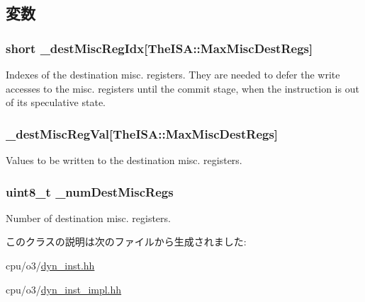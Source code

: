\subsection{変数}
\hypertarget{classBaseO3DynInst_acb44bcca662946d56b308535bf3a53e8}{
\subsubsection[{\_\-destMiscRegIdx}]{\setlength{\rightskip}{0pt plus 5cm}short {\bf \_\-destMiscRegIdx}\mbox{[}TheISA::MaxMiscDestRegs\mbox{]}}}
\label{classBaseO3DynInst_acb44bcca662946d56b308535bf3a53e8}
Indexes of the destination misc. registers. They are needed to defer the write accesses to the misc. registers until the commit stage, when the instruction is out of its speculative state. \hypertarget{classBaseO3DynInst_a337a2257f9bbbe5447a9d37b5f90745f}{
\subsubsection[{\_\-destMiscRegVal}]{ {\bf \_\-destMiscRegVal}\mbox{[}TheISA::MaxMiscDestRegs\mbox{]}}}
\label{classBaseO3DynInst_a337a2257f9bbbe5447a9d37b5f90745f}
Values to be written to the destination misc. registers. \hypertarget{classBaseO3DynInst_a38e35288fa007817d30cbd80ceb43400}{
\subsubsection[{\_\-numDestMiscRegs}]{\setlength{\rightskip}{0pt plus 5cm}uint8\_\-t {\bf \_\-numDestMiscRegs}}}
\label{classBaseO3DynInst_a38e35288fa007817d30cbd80ceb43400}
Number of destination misc. registers. 

このクラスの説明は次のファイルから生成されました:\begin{DoxyCompactItemize}
\item 
cpu/o3/\hyperlink{o3_2dyn__inst_8hh}{dyn\_\-inst.hh}\item 
cpu/o3/\hyperlink{o3_2dyn__inst__impl_8hh}{dyn\_\-inst\_\-impl.hh}\end{DoxyCompactItemize}
